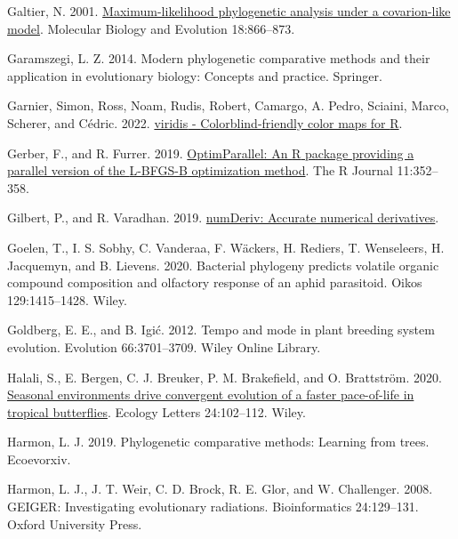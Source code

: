 \documentclass[fleqn,10pt,lineno]{wlpeerj} %
\newlength{\cslhangindent}
\newlength{\cslentryspacingunit} %
\newenvironment{CSLReferences}[2] %
 {%
  \setlength{\parindent}{0pt}
  \ifodd #1
  \let\oldpar\par
  \def\par{\hangindent=\cslhangindent\oldpar}
  \fi
  \setlength{\parskip}{#2\cslentryspacingunit}
 }%
 {}
\begin{document}
\begin{CSLReferences}{1}{0}
\leavevmode{}%
Galtier, N. 2001. \href{https://doi.org/10.1093/oxfordjournals.molbev.a003868}{Maximum-likelihood phylogenetic analysis under a covarion-like model}. Molecular Biology and Evolution 18:866--873.

\leavevmode{}%
Garamszegi, L. Z. 2014. Modern phylogenetic comparative methods and their application in evolutionary biology: Concepts and practice. Springer.

\leavevmode{}%
Garnier, Simon, Ross, Noam, Rudis, Robert, Camargo, A. Pedro, Sciaini, Marco, Scherer, and Cédric. 2022. \href{https://doi.org/10.5281/zenodo.4679424}{{viridis} - {C}olorblind-friendly color maps for {R}}.

\leavevmode{}%
Gerber, F., and R. Furrer. 2019. \href{https://doi.org/10.32614/RJ-2019-030}{Optim{P}arallel: An {R} package providing a parallel version of the {L-BFGS-B} optimization method}. The R Journal 11:352--358.

\leavevmode{}%
Gilbert, P., and R. Varadhan. 2019. \href{https://CRAN.R-project.org/package=numDeriv}{numDeriv: Accurate numerical derivatives}.

\leavevmode{}%
Goelen, T., I. S. Sobhy, C. Vanderaa, F. Wäckers, H. Rediers, T. Wenseleers, H. Jacquemyn, and B. Lievens. 2020. Bacterial phylogeny predicts volatile organic compound composition and olfactory response of an aphid parasitoid. Oikos 129:1415--1428. Wiley.

\leavevmode{}%
Goldberg, E. E., and B. Igić. 2012. Tempo and mode in plant breeding system evolution. Evolution 66:3701--3709. Wiley Online Library.

\leavevmode{}%
Halali, S., E. Bergen, C. J. Breuker, P. M. Brakefield, and O. Brattström. 2020. \href{https://doi.org/10.1111/ele.13626}{Seasonal environments drive convergent evolution of a faster pace-of-life in tropical butterflies}. Ecology Letters 24:102--112. Wiley.

\leavevmode{}%
Harmon, L. J. 2019. Phylogenetic comparative methods: Learning from trees. Ecoevorxiv.

\leavevmode{}%
Harmon, L. J., J. T. Weir, C. D. Brock, R. E. Glor, and W. Challenger. 2008. {GEIGER}: Investigating evolutionary radiations. Bioinformatics 24:129--131. Oxford University Press.


\end{CSLReferences}
\end{document}
